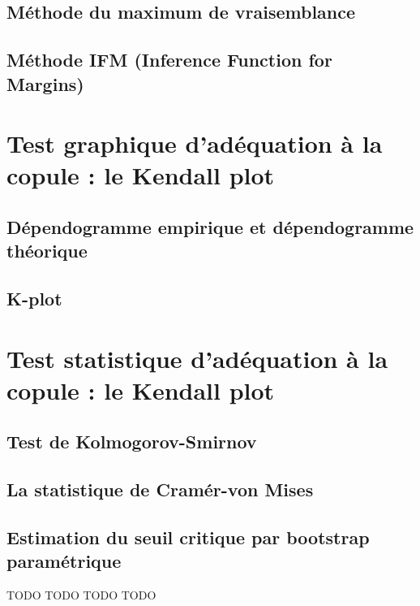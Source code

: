 \subsection{Méthode du maximum de vraisemblance}

\subsection{Méthode IFM (Inference Function for Margins)}



\section{Test graphique d'adéquation à la copule : le Kendall plot}

\subsection{Dépendogramme empirique et dépendogramme théorique}

\subsection{K-plot}

\section{Test statistique d'adéquation à la copule : le Kendall plot}

\subsection{Test de Kolmogorov-Smirnov}

\subsection{La statistique de Cramér-von Mises}

\subsection{Estimation du seuil critique par bootstrap paramétrique}





TODO   TODO   TODO   TODO



